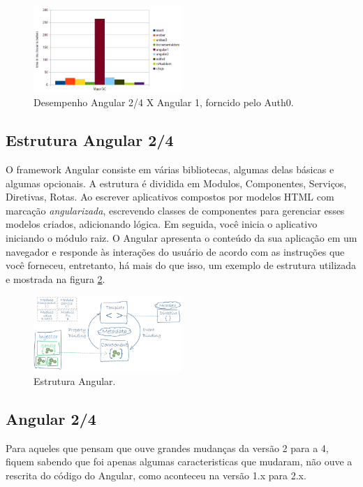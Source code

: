 \documentclass[12pt]{article}
\begin{document}
\begin{figure}[H]
	\centering
	\includegraphics[width=0.5\textwidth]{imagens/desempenho.png}
	\caption{Desempenho Angular 2/4 X Angular 1, forncido pelo Auth0. }
	\label{fig:De}
	
\end{figure}



\subsection{Estrutura Angular 2/4}

O framework Angular consiste em várias bibliotecas, algumas delas básicas e algumas opcionais.
A estrutura é dividida em Modulos, Componentes, Serviços, Diretivas, Rotas.  
Ao escrever aplicativos compostos por modelos HTML com marcação \textit{angularizada}, escrevendo classes de componentes para gerenciar esses modelos criados, adicionando lógica. Em seguida, você inicia o aplicativo iniciando o módulo raiz. O Angular apresenta o conteúdo da sua aplicação em um navegador e responde às interações do usuário de acordo com as instruções que você forneceu, entretanto, há mais do que isso, um exemplo de estrutura utilizada e mostrada na figura \ref{fig:Est}.


\begin{figure}[H]
	\centering
	\includegraphics[width=0.5\textwidth]{imagens/EstruturaAngular.png}
	\caption{Estrutura Angular.}
	\label{fig:Est}
	
\end{figure}



\subsection{Angular 2/4}
	Para aqueles que pensam que ouve grandes mudanças da versão 2 para a 4, fiquem sabendo que foi apenas algumas caracteristicas que mudaram, não ouve a rescrita do código do Angular, como aconteceu na versão 1.x para 2.x.
	
\end{document}
